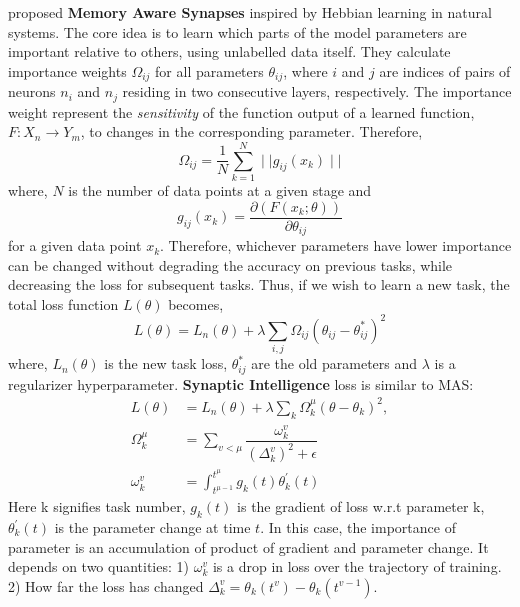 \documentclass[11pt,a4paper]{article}
\begin{document}
 \citet{aljundi2018memory} proposed \textbf{Memory Aware Synapses} inspired by Hebbian learning in natural systems. The core idea is to learn which parts of the model parameters are important relative to others, using unlabelled data itself. They calculate importance weights $\Omega_{ij}$ for all parameters $\theta_{ij}$, where $i$ and $j$ are indices of pairs of neurons $n_i$ and $n_j$ residing in two consecutive layers, respectively. The importance weight represent the \textit{sensitivity} of the function output of a learned function, $F:X_n \longrightarrow Y_m$, to changes in the corresponding parameter. Therefore,
 \vspace{-0.3cm}
\begin{equation}
\Omega_{ij} =\frac{1}{N}\sum_{k=1}^N  \mid\mid g_{ij} (x_k) \mid\mid
\label{eq:omega_mas}
\end{equation}
where, $N$ is the number of data points at a given stage and
 \vspace{-0.3cm}
\begin{equation}
g_{ij} (x_k)=\frac{\partial  (F (x_k; \theta))}{\partial \theta_{ij}}
\label{eq:grad_mas}
\end{equation}
for a given data point $x_k$. Therefore, whichever parameters have lower importance can be changed without degrading the accuracy on previous tasks, while decreasing the loss for subsequent tasks. Thus, if we wish to learn a new task, the total loss function $L (\theta)$ becomes,
\begin{equation}
    L (\theta)=L_n (\theta)+{\lambda} \sum_{i,j} \Omega_{ij} (\theta_{ij}-\theta^*_{ij})^2
    \label{eq:mas_loss}
\end{equation}
where, $L_n (\theta)$ is the new task loss, $\theta^*_{ij}$ are the old parameters and $\lambda$ is a regularizer hyperparameter.
\citet{DBLP:journals/corr/ZenkePG17} \textbf{Synaptic Intelligence} loss is similar to MAS: 
 \begin{align*}
     L (\theta) &=L_n (\theta)+{\lambda} \sum_{k} \Omega_k^{\mu}  (\theta - \theta_k)^2,\\ 
    \Omega_k^{\mu} &= \sum_{v<\mu} \dfrac{\omega_k^v}{ (\Delta_k^v)^2+\epsilon} \\
     \omega_k^v &= \int_{t^{\mu-1}}^{t^{\mu}} g_k (t)\theta^{'}_k (t)
 \end{align*}
Here k signifies task number, $g_k (t)$ is the gradient of loss w.r.t parameter k, $\theta^{'}_k (t)$ is the parameter change at time $t$. In this case, the importance of parameter is an accumulation of product of gradient and parameter change. It depends on two quantities: 1) $ \omega_k^v $ is a drop in loss over the trajectory of training. 2) How far the loss has changed $\Delta_k^v = \theta_k (t^v) - \theta_k (t^{v-1})$.
\end{document}
